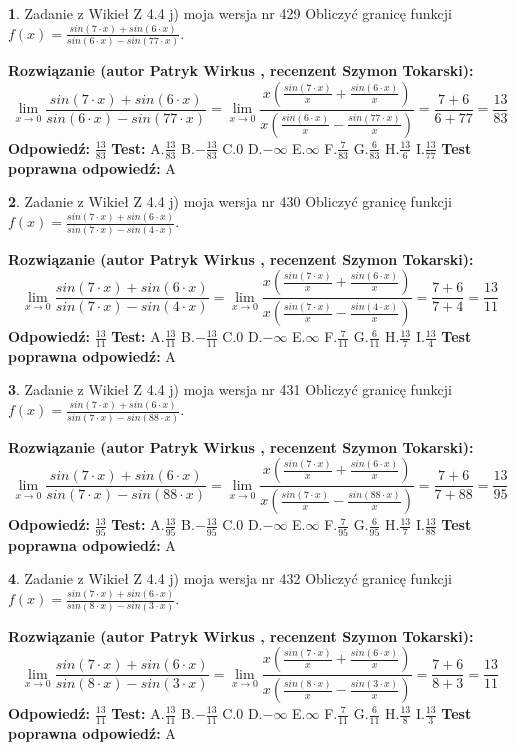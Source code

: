 \documentclass[12pt, a4paper]{article}
\theoremstyle{definition} %
\newtheorem{zad}{}
\newcommand{\zadStart}[1]{\begin{zad}#1\newline}
\newcommand{\zadStop}{\end{zad}}
\newcommand{\rozwStart}[2]{\noindent \textbf{Rozwiązanie (autor #1 , recenzent #2): }\newline}
\newcommand{\rozwStop}{\newline}
\newcommand{\odpStart}{\noindent \textbf{Odpowiedź:}\newline}
\newcommand{\odpStop}{\newline}
\newcommand{\testStart}{\noindent \textbf{Test:}\newline}
\newcommand{\testStop}{\newline}
\newcommand{\kluczStart}{\noindent \textbf{Test poprawna odpowiedź:}\newline}
\newcommand{\kluczStop}{\newline}
\begin{document}
\zadStart{Zadanie z Wikieł Z 4.4 j) moja wersja nr 429}
Obliczyć granicę funkcji $f(x)=\frac{sin(7\cdot x) +sin(6\cdot x)}{sin(6\cdot x) -sin(77\cdot x)}$.
\zadStop
\rozwStart{Patryk Wirkus}{Szymon Tokarski}
$$\lim\limits_{x\to 0}\frac{sin(7\cdot x) +sin(6\cdot x)}{sin(6\cdot x) -sin(77\cdot x)}=\lim\limits_{x\to 0}\frac{x(\frac{sin(7\cdot x)}{x}+\frac{sin(6\cdot x)}{x})}{x(\frac{sin(6\cdot x)}{x}-\frac{sin(77\cdot x)}{x})}=\frac{7+6}{6+77} = \frac{13}{83}$$
\rozwStop
\odpStart
$\frac{13}{83}$
\odpStop
\testStart
A.$\frac{13}{83}$
B.$-\frac{13}{83}$
C.$0$
D.$-\infty$
E.$\infty$
F.$\frac{7}{83}$
G.$\frac{6}{83}$
H.$\frac{13}{6}$
I.$\frac{13}{77}$
\testStop
\kluczStart
A
\kluczStop



\zadStart{Zadanie z Wikieł Z 4.4 j) moja wersja nr 430}
Obliczyć granicę funkcji $f(x)=\frac{sin(7\cdot x) +sin(6\cdot x)}{sin(7\cdot x) -sin(4\cdot x)}$.
\zadStop
\rozwStart{Patryk Wirkus}{Szymon Tokarski}
$$\lim\limits_{x\to 0}\frac{sin(7\cdot x) +sin(6\cdot x)}{sin(7\cdot x) -sin(4\cdot x)}=\lim\limits_{x\to 0}\frac{x(\frac{sin(7\cdot x)}{x}+\frac{sin(6\cdot x)}{x})}{x(\frac{sin(7\cdot x)}{x}-\frac{sin(4\cdot x)}{x})}=\frac{7+6}{7+4} = \frac{13}{11}$$
\rozwStop
\odpStart
$\frac{13}{11}$
\odpStop
\testStart
A.$\frac{13}{11}$
B.$-\frac{13}{11}$
C.$0$
D.$-\infty$
E.$\infty$
F.$\frac{7}{11}$
G.$\frac{6}{11}$
H.$\frac{13}{7}$
I.$\frac{13}{4}$
\testStop
\kluczStart
A
\kluczStop



\zadStart{Zadanie z Wikieł Z 4.4 j) moja wersja nr 431}
Obliczyć granicę funkcji $f(x)=\frac{sin(7\cdot x) +sin(6\cdot x)}{sin(7\cdot x) -sin(88\cdot x)}$.
\zadStop
\rozwStart{Patryk Wirkus}{Szymon Tokarski}
$$\lim\limits_{x\to 0}\frac{sin(7\cdot x) +sin(6\cdot x)}{sin(7\cdot x) -sin(88\cdot x)}=\lim\limits_{x\to 0}\frac{x(\frac{sin(7\cdot x)}{x}+\frac{sin(6\cdot x)}{x})}{x(\frac{sin(7\cdot x)}{x}-\frac{sin(88\cdot x)}{x})}=\frac{7+6}{7+88} = \frac{13}{95}$$
\rozwStop
\odpStart
$\frac{13}{95}$
\odpStop
\testStart
A.$\frac{13}{95}$
B.$-\frac{13}{95}$
C.$0$
D.$-\infty$
E.$\infty$
F.$\frac{7}{95}$
G.$\frac{6}{95}$
H.$\frac{13}{7}$
I.$\frac{13}{88}$
\testStop
\kluczStart
A
\kluczStop



\zadStart{Zadanie z Wikieł Z 4.4 j) moja wersja nr 432}
Obliczyć granicę funkcji $f(x)=\frac{sin(7\cdot x) +sin(6\cdot x)}{sin(8\cdot x) -sin(3\cdot x)}$.
\zadStop
\rozwStart{Patryk Wirkus}{Szymon Tokarski}
$$\lim\limits_{x\to 0}\frac{sin(7\cdot x) +sin(6\cdot x)}{sin(8\cdot x) -sin(3\cdot x)}=\lim\limits_{x\to 0}\frac{x(\frac{sin(7\cdot x)}{x}+\frac{sin(6\cdot x)}{x})}{x(\frac{sin(8\cdot x)}{x}-\frac{sin(3\cdot x)}{x})}=\frac{7+6}{8+3} = \frac{13}{11}$$
\rozwStop
\odpStart
$\frac{13}{11}$
\odpStop
\testStart
A.$\frac{13}{11}$
B.$-\frac{13}{11}$
C.$0$
D.$-\infty$
E.$\infty$
F.$\frac{7}{11}$
G.$\frac{6}{11}$
H.$\frac{13}{8}$
I.$\frac{13}{3}$
\testStop
\kluczStart
A
\kluczStop
\end{document}
